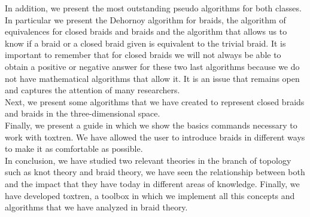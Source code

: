 In addition, we present the most outstanding pseudo algorithms for both classes. In particular we present the Dehornoy algorithm for braids, the algorithm of equivalences for closed braids and braids and the algorithm that allows us to know if a braid or a closed braid given is equivalent to the trivial braid. It is important to remember that for closed braids we will not always be able to obtain a positive or negative answer for these two last algorithms because we do not have mathematical algorithms that allow it. It is an issue that remains open and captures the attention of many researchers.\\ Next, we present some algorithms that we have created to represent closed braids and braids in the three-dimensional space.\\




Finally, we present a guide in which we show the basics commands necessary to work with toxtren. We have allowed the user to introduce braids in different ways to make it as comfortable as possible.\\

\newpage
In conclusion, we have studied two relevant theories in the branch of topology such as knot theory and braid theory, we have seen the relationship between both and the impact that they have today in different areas of knowledge. Finally, we have developed toxtren, a toolbox in which we implement all this concepts and algorithms that we have analyzed in braid theory.\\










